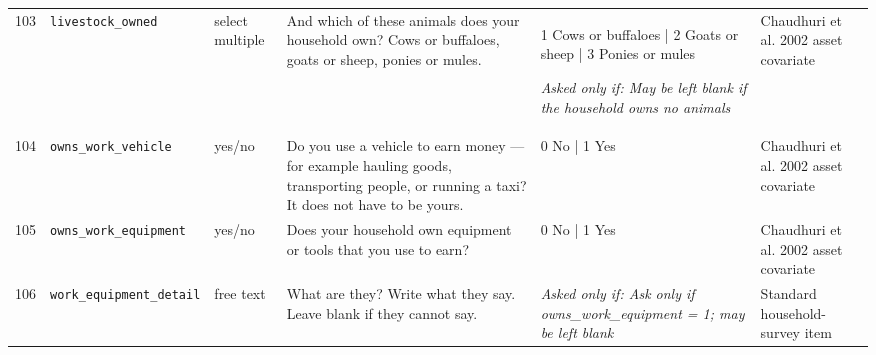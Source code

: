 \documentclass[9pt,a4paper,landscape]{article}
\begin{document}
\begin{longtable}{@{}p{0.5cm}p{3.3cm}p{1.7cm}p{7.3cm}p{5.6cm}p{5.4cm}@{}}
\footnotesize 103 & \footnotesize\texttt{livestock\_owned} & \scriptsize select multiple & \footnotesize And which of these animals does your household own? Cows or buffaloes, goats or sheep, ponies or mules.\par\vspace{1pt}{\footnotesize\color{hdr}{\hifont और इनमें से कौन-कौन से जानवर आपके घर में हैं? गाय या भैंस, बकरी या भेड़, घोड़े या खच्चर।}} & \scriptsize 1 Cows or buffaloes | 2 Goats or sheep | 3 Ponies or mules\par\vspace{1pt}\textit{Asked only if: May be left blank if the household owns no animals} & \scriptsize Chaudhuri et al. 2002 asset covariate\\
\footnotesize 104 & \footnotesize\texttt{owns\_work\_vehicle} & \scriptsize yes/no & \footnotesize Do you use a vehicle to earn money — for example hauling goods, transporting people, or running a taxi? It does not have to be yours.\par\vspace{1pt}{\footnotesize\color{hdr}{\hifont क्या आपके घर की अपनी गाड़ी है जिससे आप कमाते हैं (जैसे जीप, ट्रक या टैक्सी)?}} & \scriptsize 0 No | 1 Yes & \scriptsize Chaudhuri et al. 2002 asset covariate\\
\footnotesize 105 & \footnotesize\texttt{owns\_work\_equipment} & \scriptsize yes/no & \footnotesize Does your household own equipment or tools that you use to earn?\par\vspace{1pt}{\footnotesize\color{hdr}{\hifont क्या आपके घर के पास काम के औज़ार या मशीन है जिससे आप कमाते हैं?}} & \scriptsize 0 No | 1 Yes & \scriptsize Chaudhuri et al. 2002 asset covariate\\
\footnotesize 106 & \footnotesize\texttt{work\_equipment\_detail} & \scriptsize free text & \footnotesize What are they? Write what they say. Leave blank if they cannot say.\par\vspace{1pt}{\footnotesize\color{hdr}{\hifont वे क्या हैं? जैसा वे बताएँ वैसा लिख लीजिए। न बता पाएँ तो खाली छोड़ दीजिए।}} & \scriptsize \textit{Asked only if: Ask only if owns\_work\_equipment = 1; may be left blank} & \scriptsize Standard household-survey item\\
\bottomrule\end{longtable}\vspace{6pt}
\\[3pt]
\end{document}
